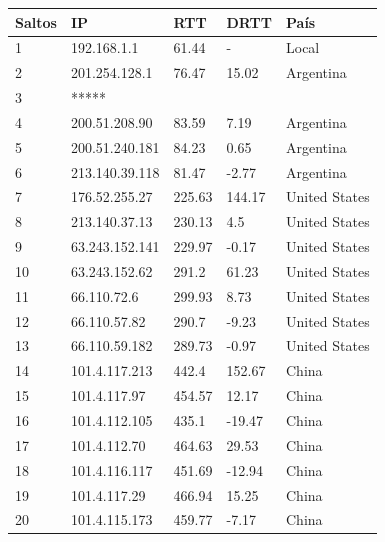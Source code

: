 \begin{center}
    \begin{tabular}{| l | l | l | l | l | }
    \hline
    Saltos & IP                       & RTT     & DRTT   & País          \\ \hline
    1   	   & 192.168.1.1        & 61.44   & -           & Local         \\ \hline
    2   	   & 201.254.128.1    & 76.47   & 15.02   & Argentina   \\ \hline
    3   	   & *****                    &             &             &                    \\ \hline
    4   	   & 200.51.208.90    & 83.59   & 7.19     & Argentina    \\ \hline
    5   	   & 200.51.240.181  & 84.23   & 0.65     & Argentina    \\ \hline
    6   	   & 213.140.39.118  & 81.47   & -2.77    & Argentina    \\ \hline
    7   	   & 176.52.255.27    & 225.63 & 144.17 & United States \\ \hline
    8   	   & 213.140.37.13    & 230.13 & 4.5       & United States \\ \hline
    9   	   & 63.243.152.141  & 229.97 & -0.17    & United States  \\ \hline
    10   	   & 63.243.152.62    & 291.2   & 61.23   & United States  \\ \hline
    11   	   & 66.110.72.6        & 299.93 & 8.73     & United States  \\ \hline
    12   	   & 66.110.57.82      & 290.7   & -9.23    & United States  \\ \hline
    13   	   & 66.110.59.182    & 289.73 & -0.97    & United States  \\ \hline
    14   	   & 101.4.117.213    & 442.4   & 152.67 & China               \\ \hline
    15   	   & 101.4.117.97      & 454.57 & 12.17   & China               \\ \hline
    16   	   & 101.4.112.105    & 435.1   & -19.47  & China               \\ \hline
    17   	   & 101.4.112.70      & 464.63 & 29.53   & China               \\ \hline
    18   	   & 101.4.116.117    & 451.69 & -12.94  & China               \\ \hline
    19   	   & 101.4.117.29      & 466.94 & 15.25   & China               \\ \hline
    20   	   & 101.4.115.173    & 459.77 & -7.17    & China               \\ \hline

\end{tabular}
\end{center}
